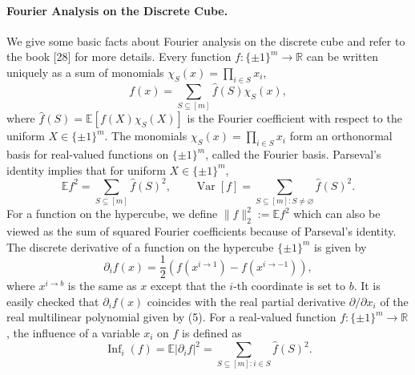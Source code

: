 \documentclass[10pt,a4paper]{article}
\begin{document}
\paragraph{Fourier Analysis on the Discrete Cube.}
We give some basic facts about Fourier analysis on the discrete cube and refer to the book [28] for more details. Every function $f:\{\pm1\}^m\to\mathbb R$ can be written uniquely as a sum of monomials $\chi_S(x)=\prod_{i\in S}x_i$,
\[f(x)=\sum_{S\subseteq[m]}\widehat f(S)\chi_S(x),\tag{5}\]
where $\widehat f(S)=\mathbb E[f(X)\chi_S(X)]$ is the Fourier coefficient with respect to the uniform $X\in\{\pm1\}^m$. The monomials $\chi_S(x)=\prod_{i\in S}x_i$ form an orthonormal basis for real-valued functions on $\{\pm1\}^m$, called the Fourier basis. Parseval's identity implies that for uniform $X\in\{\pm1\}^m$,
\[\mathbb Ef^2=\sum_{S\subseteq[m]}\widehat f(S)^2,\qquad\operatorname{Var}[f]=\sum_{S\subseteq[m]:S\neq\varnothing}\widehat f(S)^2.\]
For a function on the hypercube, we define $\|f\|_2^2:=\mathbb Ef^2$ which can also be viewed as the sum of squared Fourier coefficients because of Parseval's identity.
The discrete derivative of a function on the hypercube $\{\pm1\}^m$ is given by
\[\partial_i f(x)=\frac12(f(x^{i\to1})-f(x^{i\to-1})),\]
where $x^{i\to b}$ is the same as $x$ except that the $i$-th coordinate is set to $b$. It is easily checked that $\partial_i f(x)$ coincides with the real partial derivative $\partial/\partial x_i$ of the real multilinear polynomial given by (5).
For a real-valued function $f:\{\pm1\}^m\to\mathbb R$, the influence of a variable $x_i$ on $f$ is defined as
\[\operatorname{Inf}_i(f)=\mathbb E|\partial_i f|^2=\sum_{S\subseteq[m]:i\in S}\widehat f(S)^2.\]
\end{document}
